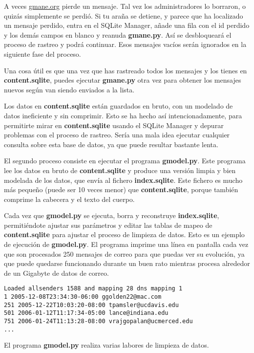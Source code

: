 A veces \url{gmane.org} pierde un mensaje. Tal vez los administradores lo borraron,
o quizás simplemente se perdió. Si tu araña se detiene, y parece que ha localizado
un mensaje perdido, entra en el SQLite Manager, añade una fila con el id perdido y los
demás campos en blanco y reanuda {\bf gmane.py}. Así se desbloqueará el
proceso de rastreo y podrá continuar. Esos mensajes vacíos serán ignorados en la siguiente
fase del proceso.

Una cosa útil es que una vez que has rastreado todos los mensajes y los tienes en
{\bf content.sqlite}, puedes ejecutar {\bf gmane.py} otra vez para obtener los mensajes
nuevos según van siendo enviados a la lista.

Los datos en {\bf content.sqlite} están guardados en bruto, con un modelado de datos
ineficiente y sin comprimir.
Esto se ha hecho así intencionadamente, para permitirte mirar en {\bf content.sqlite}
usando el SQLite Manager y depurar problemas con el proceso de rastreo.
Sería una mala idea ejecutar cualquier consulta sobre esta base de datos, ya que
puede resultar bastante lenta.

El segundo proceso consiste en ejecutar el programa {\bf gmodel.py}. Este programa lee los datos
en bruto de {\bf content.sqlite} y produce una versión limpia y bien modelada de los datos,
que envía al fichero {\bf index.sqlite}. Este fichero es mucho más pequeño (puede ser 10 veces
menor) que {\bf content.sqlite}, porque también comprime la cabecera y el texto del cuerpo.

Cada vez que {\bf gmodel.py} se ejecuta, borra y reconstruye {\bf index.sqlite}, permitiéndote
ajustar sus parámetros y editar las tablas de mapeo de {\bf content.sqlite} para ajustar el
proceso de limpieza de datos. Esto es un ejemplo de ejecución de {\bf gmodel.py}. El programa imprime
una línea en pantalla cada vez que son procesados 250 mensajes de correo para que puedas ver su
evolución, ya que puede quedarse funcionando durante un buen rato mientras procesa alrededor de
un Gigabyte de datos de correo.

\beforeverb
\begin{verbatim}
Loaded allsenders 1588 and mapping 28 dns mapping 1
1 2005-12-08T23:34:30-06:00 ggolden22@mac.com
251 2005-12-22T10:03:20-08:00 tpamsler@ucdavis.edu
501 2006-01-12T11:17:34-05:00 lance@indiana.edu
751 2006-01-24T11:13:28-08:00 vrajgopalan@ucmerced.edu
...
\end{verbatim}
\afterverb
%
El programa {\bf gmodel.py} realiza varias labores de limpieza de datos.

